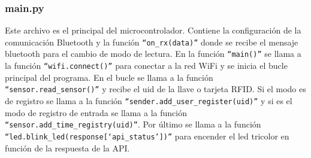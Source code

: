\documentclass{article}
\begin{document}
\subsubsection{main.py}
Este archivo es el principal del microcontrolador.
Contiene la configuración de la comunicación Bluetooth y la función \texttt{``on\_rx(data)''} donde se recibe el mensaje bluetooth para el cambio de modo de lectura.
En la función \texttt{``main()''} se llama a la función \texttt{``wifi.connect()''} para conectar a la red WiFi y se inicia el bucle principal del programa.
En el bucle se llama a la función \texttt{``sensor.read\_sensor()''} y recibe el uid de la llave o tarjeta RFID. 
Si el modo es de registro se llama a la función \texttt{``sender.add\_user\_register(uid)''} y si es el modo de registro de entrada se llama a la función \texttt{``sensor.add\_time\_registry(uid)''}.
Por último se llama a la función \texttt{``led.blink\_led(response[`api\_status'])''} para encender el led tricolor en función de la respuesta de la API.
\end{document}

